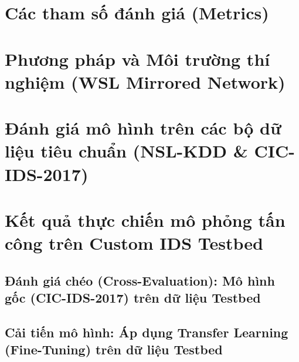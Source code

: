 \documentclass[../DoAn.tex]{subfiles}
\begin{document}
\section{Các tham số đánh giá (Metrics)}

\section{Phương pháp và Môi trường thí nghiệm (WSL Mirrored Network)}

\section{Đánh giá mô hình trên các bộ dữ liệu tiêu chuẩn (NSL-KDD \& CIC-IDS-2017)}

\section{Kết quả thực chiến mô phỏng tấn công trên Custom IDS Testbed}

\subsection{Đánh giá chéo (Cross-Evaluation): Mô hình gốc (CIC-IDS-2017) trên dữ liệu Testbed}

\subsection{Cải tiến mô hình: Áp dụng Transfer Learning (Fine-Tuning) trên dữ liệu Testbed}
\end{document}
